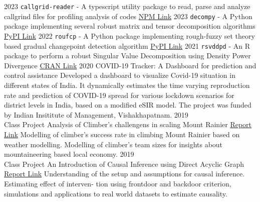 \documentclass[9pt]{developercv} %
\begin{document}
\begin{entrylist}
    \vspace{-10pt}
    \entry
        {2023}
        {\texttt{callgrid-reader} - A typescript utility package to read, parse and analyze callgrind files for profiling analysis of codes}
        {\href{https://www.npmjs.com/package/callgrind-reader}{NPM Link}}
        {}
    \vspace{-10pt}
    \entry
        {2023}
        {\texttt{decompy} - A Python package implementing several robust matrix and tensor decomposition algorithms}
        {\href{https://pypi.org/project/decompy/}{PyPI Link}}
        {}
    \vspace{-10pt}
    \entry
        {2022}
        {\texttt{roufcp} - A Python package implementing rough-fuzzy set theory based gradual changepoint detection algorithm}
        {\href{https://pypi.org/project/roufcp/}{PyPI Link}}
        {}
        \vspace{-10pt}
    \entry
        {2021}
        {\texttt{rsvddpd} - An R package to perform a robust Singular Value Decomposition using Density Power Divergence}
        {\href{https://cran.r-project.org/web/packages/rsvddpd/index.html}{CRAN Link}}
        {}
    \entry
        {2020}
        {COVID-19 Tracker: A Dashboard for prediction and control assistance}
        {}
        {Developed a dashboard to visualize Covid-19 situation in different states of India. It dynamically estimates the time varying reproduction rate and prediction of COVID-19 spread for various lockdown scenarios for district levels in India, based on a modified eSIR model. The project was funded by Indian Insititute of Management, Vishakhapatnam.}
    \entry
		{2019\\Class Project}
		{Analysis of Climber's challengens in scaling Mount Rainier}
		{\href{https://github.com/subroy13/mount-rainier-case-study}{Report Link} }
		{Modelling of climber's success rate in climbing Mount Rainier based on weather modelling. Modelling of climber's team sizes for insights about mountaineering based local economy.}
    \entry
		{2019\\Class Project}
		{An Introduction of Causal Inference using Direct Acyclic Graph}
		{\href{https://www.statwizard.in/aboutme/causal-dag/final-report.pdf}{Report Link} }
		{Understanding of the setup and assumptions for causal inference. Estimating effect of interven-
        tion using frontdoor and backdoor criterion, simulations and applications to real world datasets to estimate
        causality.}
\end{entrylist}
\end{document}
